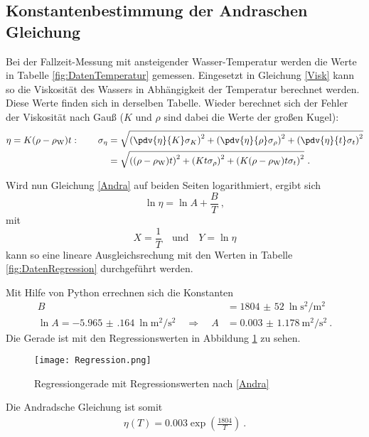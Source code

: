 \subsection{Konstantenbestimmung der Andraschen Gleichung}
Bei der Fallzeit-Messung mit ansteigender Wasser-Temperatur werden die Werte in Tabelle \ref{fig:DatenTemperatur} gemessen. Eingesetzt in Gleichung \eqref{Visk} kann so die Viskosität des Wassers in Abhängigkeit der Temperatur berechnet werden. Diese Werte finden sich in derselben Tabelle. Wieder berechnet sich der Fehler der Viskosität nach Gauß ($K$ und $\rho$ sind dabei die Werte der großen Kugel):
\begin{align}
	\eta = K(\rho-\rho_\text{W})t: \qquad \sigma_{\eta} &= \sqrt{\left(\pdv{\eta}{K}\sigma_K\right)^2+\left(\pdv{\eta}{\rho}\sigma_{\rho}\right)^2 + \left(\pdv{\eta}{t}\sigma_{t}\right)^2} \\
	&= \sqrt{\left((\rho-\rho_\text{W})t\right)^2+\left(Kt\sigma_\rho\right)^2+\left(K(\rho-\rho_\text{W})t\sigma_t\right)^2} \ .
\end{align}




Wird nun Gleichung \eqref{Andra} auf beiden Seiten logarithmiert, ergibt sich
\[ \ln\eta = \ln A + \frac{B}{T} \ , \]
mit
\[ X = \frac{1}{T} \quad \text{und} \quad Y = \ln\eta \]
kann so eine lineare Ausgleichsrechung mit den Werten in Tabelle \ref{fig:DatenRegression} durchgeführt werden.

Mit Hilfe von Python errechnen sich die Konstanten
\begin{align}
	B &= \SI{1804(52)}{\ln\second\squared\per\metre\squared} \\
	\ln A = \SI{-5.965(164)}{\ln\metre\squared\per\second\squared} \quad \Rightarrow \quad A &= \SI{0.003(1178)}{\metre\squared\per\second\squared} \ .
\end{align}
Die Gerade ist mit den Regressionswerten in Abbildung \ref{fig:Regression} zu sehen.
\begin{figure}[h!]
	\centering
	\texttt{[image: Regression.png]}
	\caption{Regressiongerade mit Regressionswerten nach \eqref{Andra}}
	\label{fig:Regression}
\end{figure}
Die Andradsche Gleichung ist somit
\begin{align}
	\eta(T) = 0.003\exp\left(\frac{1804}{T}\right) \ .
\end{align}
\clearpage

